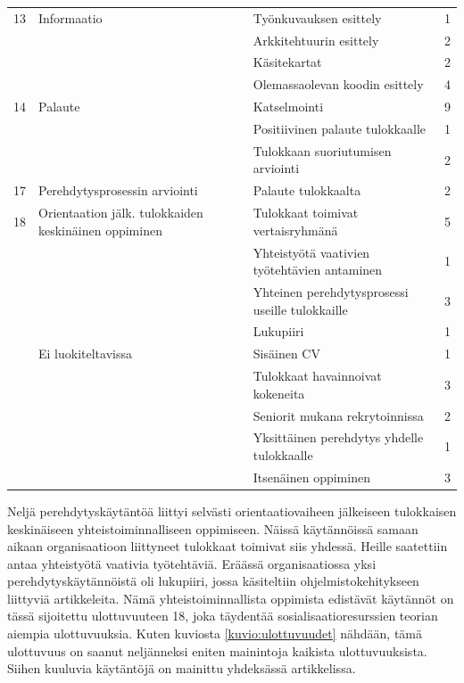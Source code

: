 \documentclass[utf8]{gradu3}
\begin{document}
\begin{scriptsize}
\begin{longtable}[c]{llll}
    \hline
    13 & Informaatio & Työnkuvauksen esittely & 1\\
    & & Arkkitehtuurin esittely & 2\\
    & & Käsitekartat & 2\\
    & & Olemassaolevan koodin esittely & 4\\
    \hline
    14 & Palaute & Katselmointi & 9\\
    & & Positiivinen palaute tulokkaalle & 1\\
    & & Tulokkaan suoriutumisen arviointi & 2\\
    \hline
    17 & Perehdytysprosessin arviointi & Palaute tulokkaalta & 2\\
    \hline
    18 & Orientaation jälk. tulokkaiden keskinäinen oppiminen & Tulokkaat toimivat vertaisryhmänä & 5\\
    & & Yhteistyötä vaativien työtehtävien antaminen & 1\\
    & & Yhteinen perehdytysprosessi useille tulokkaille & 3\\
    & & Lukupiiri & 1\\
    \hline
    & Ei luokiteltavissa & Sisäinen CV & 1 \\
    & & Tulokkaat havainnoivat kokeneita & 3\\
    & & Seniorit mukana rekrytoinnissa & 2\\
    & & Yksittäinen perehdytys yhdelle tulokkaalle & 1\\
    & & Itsenäinen oppiminen & 3\\
    \hline
    
    \end{longtable}
    \end{scriptsize}

Neljä perehdytyskäytäntöä liittyi selvästi orientaatiovaiheen jälkeiseen tulokkaisen keskinäiseen yhteistoiminnalliseen oppimiseen. Näissä käytännöissä samaan aikaan organisaatioon liittyneet tulokkaat toimivat siis yhdessä. Heille saatettiin antaa yhteistyötä vaativia työtehtäviä. Eräässä organisaatiossa yksi perehdytyskäytännöistä oli lukupiiri, jossa käsiteltiin ohjelmistokehitykseen liittyviä artikkeleita. Nämä yhteistoiminnallista oppimista edistävät käytännöt on tässä sijoitettu ulottuvuuteen 18, joka täydentää sosialisaatioresurssien teorian aiempia ulottuvuuksia. Kuten kuviosta \ref{kuvio:ulottuvuudet} nähdään, tämä ulottuvuus on saanut neljänneksi eniten mainintoja kaikista ulottuvuuksista. Siihen kuuluvia käytäntöjä on mainittu yhdeksässä artikkelissa. 
\end{document}
